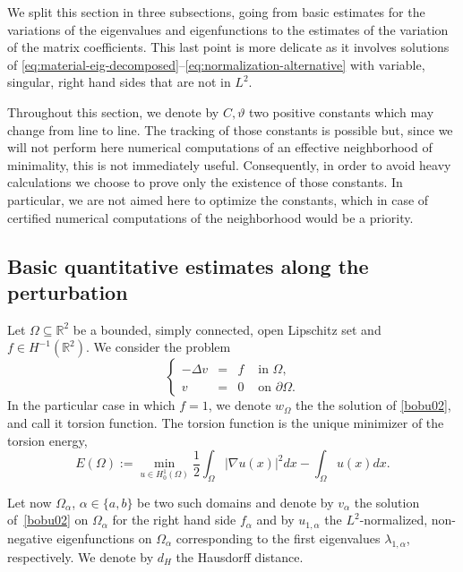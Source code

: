 \documentclass[11pt]{article}
\numberwithin{equation}{section}\newtheorem*{jepEnonce}{\jepEnonceTitle}\newenvironment{enonce*}[1]{\def\jepEnonceTitle{#1}\jepEnonce}{\endjepEnonce}\newtheorem*{conj*}{Conjecture}
\theoremstyle{plain}
\theoremstyle{definition}
\newcommand{\thetathree}{\vartheta}
\def\R{\mathbb{R}}
\newcommand{\Om}{\Omega}
\newcommand{\lb}{\lambda}
\newcommand{\sq}{\subseteq}
\begin{document}
\smallskip
We split this section in three subsections, going from basic estimates for the variations of the eigenvalues and eigenfunctions to the estimates of the variation of the matrix coefficients. This last point is more delicate as it involves solutions of \eqref{eq:material-eig-decomposed}--\eqref{eq:normalization-alternative} with variable, singular, right hand sides that are not in $L^2$.

Throughout this section, we denote by $C, \thetathree$ two positive constants which may change from line to line.
The tracking of those constants is possible but, since we will not perform here numerical computations of an effective neighborhood of minimality, this is not immediately useful. Consequently, in order to avoid heavy calculations we choose to prove only the existence of those constants. In particular, we are not aimed here to optimize the constants, which in case of certified numerical computations of the neighborhood would be a priority.

\subsection{Basic quantitative estimates along the perturbation}
Let $\Om \sq \R^2$ be a bounded, simply connected, open Lipschitz set and $f \in H^{-1} (\R^2)$. We consider the problem\vspace*{-3pt}\enlargethispage{.5\baselineskip}
\begin{equation}\label{bobu02}
\left\{ \begin{array}{rcll}
-\Delta v & =& f & \text{ in }\Omega,\\
v &= &0 & \text{ on }\partial \Omega.
\end{array} \right.
\end{equation}
In the particular case in which $f=1$, we denote $w_{\Om}$ the the solution of \eqref{bobu02}, and call it torsion function. The torsion function is the unique minimizer of the torsion energy,\vspace*{-3pt}
\[
E(\Om):= \min_{u \in H^1_0(\Om)} \frac 12 \int_\Om |\nabla u(x) |^2 dx -\int_\Om u(x) dx.
\]

Let now $\Om_\alpha$, $\alpha\in \{a,b\}$ be two such domains and denote by $v_\alpha$ the solution of~\eqref{bobu02} on $\Om_\alpha $ for the right hand side $f_\alpha$ and by $u_{1,\alpha}$ the $L^2$-normalized, non-negative eigenfunctions on $\Om_\alpha$ corresponding to the first eigenvalues $\lb_{1,\alpha}$, respectively. We denote by $d_H$ the Hausdorff distance.
\end{document}

